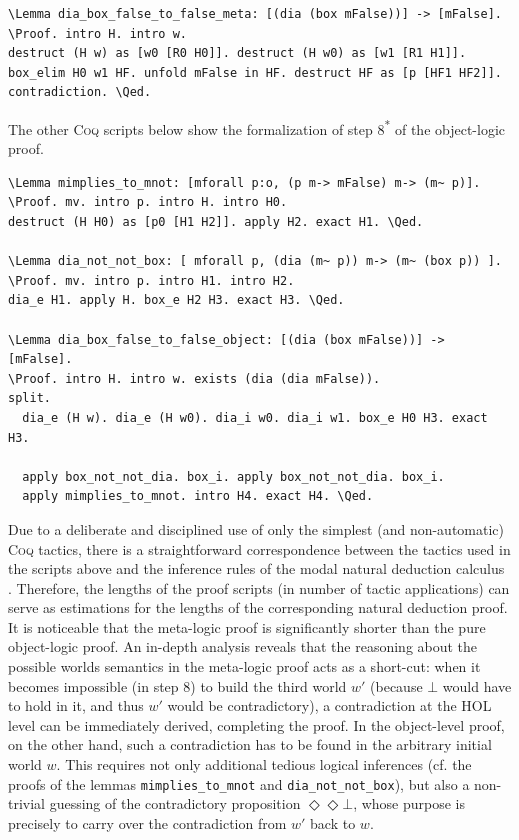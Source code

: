 \documentclass{llncs}
\newcommand{\red}[1]{\textcolor[rgb]{1,0,0}{#1}}
\newcommand{\blue}[1]{\textcolor[rgb]{0,0,1}{#1}}
\newcommand{\Lemma}{\red{Lemma}}
\newcommand{\Proof}{\blue{Proof}}
\newcommand{\Qed}{\blue{Qed}}
\newcommand{\verbsize}{\scriptsize}
\newcommand{\Dia}{\Diamond} %
\newcommand{\pos}{\Dia}
\begin{document}
\begin{Verbatim}[frame=single,commandchars=\\\{\},fontsize=\verbsize]
\Lemma dia_box_false_to_false_meta: [(dia (box mFalse))] -> [mFalse].
\Proof. intro H. intro w.
destruct (H w) as [w0 [R0 H0]]. destruct (H w0) as [w1 [R1 H1]].
box_elim H0 w1 HF. unfold mFalse in HF. destruct HF as [p [HF1 HF2]].
contradiction. \Qed.
\end{Verbatim}


\noindent
The other \textsc{Coq} scripts below show the formalization of step 8\textsuperscript{*} of the object-logic proof.

\begin{Verbatim}[frame=single,commandchars=\\\{\},fontsize=\verbsize]
\Lemma mimplies_to_mnot: [mforall p:o, (p m-> mFalse) m-> (m~ p)].
\Proof. mv. intro p. intro H. intro H0. 
destruct (H H0) as [p0 [H1 H2]]. apply H2. exact H1. \Qed.

\Lemma dia_not_not_box: [ mforall p, (dia (m~ p)) m-> (m~ (box p)) ].
\Proof. mv. intro p. intro H1. intro H2. 
dia_e H1. apply H. box_e H2 H3. exact H3. \Qed.

\Lemma dia_box_false_to_false_object: [(dia (box mFalse))] -> [mFalse].
\Proof. intro H. intro w. exists (dia (dia mFalse)).
split.
  dia_e (H w). dia_e (H w0). dia_i w0. dia_i w1. box_e H0 H3. exact H3.

  apply box_not_not_dia. box_i. apply box_not_not_dia. box_i.
  apply mimplies_to_mnot. intro H4. exact H4. \Qed.
\end{Verbatim}

\noindent
Due to a deliberate and disciplined use of only 
the simplest (and non-automatic) \textsc{Coq} tactics, 
there is a straightforward correspondence between the tactics used 
in the scripts above and the inference rules of the modal natural 
deduction calculus \cite{CSR}. Therefore, the lengths of the proof 
scripts (in number of tactic applications) can serve as estimations 
for the lengths of the corresponding natural deduction proof. 
It is noticeable that the meta-logic proof is significantly shorter 
than the pure object-logic proof. An in-depth analysis 
reveals that the reasoning about the possible worlds semantics in 
the meta-logic proof acts as a short-cut: when it becomes impossible (in step 8) to build the third world $w'$ (because $\bot$ would have to hold in it, and thus $w'$ would be contradictory), a contradiction at the HOL level can be immediately derived, completing the proof. In the object-level proof, on the other hand, such a contradiction has to be found in the arbitrary initial world $w$. This requires not only additional tedious logical inferences (cf. the proofs of the lemmas \texttt{mimplies\_to\_mnot} and \texttt{dia\_not\_not\_box}), but also a non-trivial guessing of the contradictory proposition $\pos \pos \bot$, whose purpose is precisely to carry over the contradiction from $w'$ back to $w$.
\end{document}
